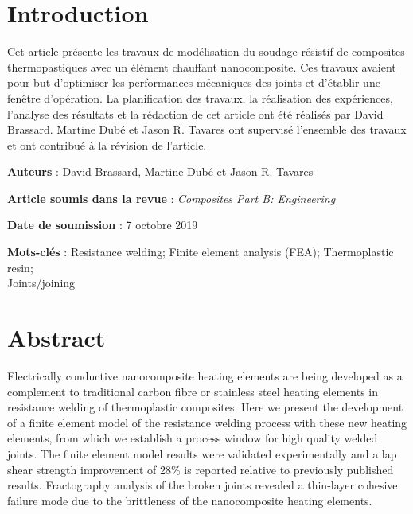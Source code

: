\label{sec:Theme2}

\section{Introduction}

Cet article présente les travaux de modélisation du soudage résistif de composites thermopastiques avec un élément chauffant nanocomposite. Ces travaux avaient pour but d'optimiser les performances mécaniques des joints et d'établir une fenêtre d'opération. La planification des travaux, la réalisation des expériences, l'analyse des résultats et la rédaction de cet article ont été réalisés par David Brassard. Martine Dubé et Jason R. Tavares ont supervisé l'ensemble des travaux et ont contribué à la révision de l'article. 

\textbf{Auteurs} : David Brassard, Martine Dubé et Jason R. Tavares

\textbf{Article soumis dans la revue} : \textit{Composites Part B: Engineering}

\textbf{Date de soumission} : 7 octobre 2019

\textbf{Mots-clés} : Resistance welding; Finite element analysis (FEA); Thermoplastic resin; \\ Joints/joining


\section{Abstract}

Electrically conductive nanocomposite heating elements are being developed as a complement to traditional carbon fibre or stainless steel heating elements in resistance welding of thermoplastic composites. 
Here we present the development of a finite element model of the resistance welding process with these new heating elements, from which we establish a process window for high quality welded joints. 
The finite element model results were validated experimentally and a lap shear strength improvement of 28\% is reported relative to previously published results. 
Fractography analysis of the broken joints revealed a thin-layer cohesive failure mode due to the brittleness of the nanocomposite heating elements. 

